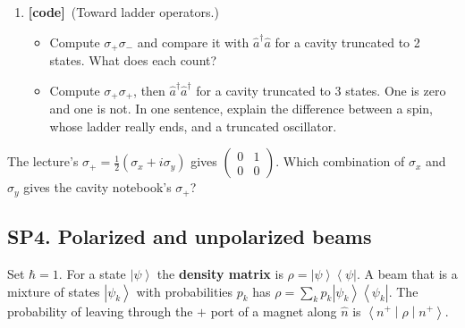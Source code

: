 \documentclass[11pt]{article}
\newif\ifsolutions
\newcommand{\tagbox}[2]{\textcolor{#1}{\textsf{\textbf{[#2]}}}}
\newcommand{\code}{\tagbox{codec}{code}}
\newcommand{\ans}[1]{\ifsolutions\par\noindent\hspace*{1.5em}\textcolor{ansc}{\small\textit{Answer:} #1}\fi}
\newcommand{\ket}[1]{\left|#1\right\rangle}
\newcommand{\bra}[1]{\left\langle#1\right|}
\newcommand{\mel}[3]{\left\langle#1\middle|#2\middle|#3\right\rangle}
\newcommand{\ad}{\hat{a}^{\dagger}}
\newcommand{\aop}{\hat{a}}
\newcommand{\mat}[4]{\begin{pmatrix}#1 & #2\\ #3 & #4\end{pmatrix}}
\begin{document}
\begin{enumerate}
\item \code\ (Toward ladder operators.)
\begin{itemize}
\item Compute $\sigma_+\sigma_-$ and compare it with $\ad\aop$ for a cavity truncated to 2 states. What does each count?
\item Compute $\sigma_+\sigma_+$, then $\ad\ad$ for a cavity truncated to 3 states. One is zero and one is not.
In one sentence, explain the difference between a spin, whose ladder really ends, and a truncated oscillator.
\end{itemize}
\ans{Both equal $\mat0001$: each counts excitations (qubit excited / one photon). $\sigma_+^2 = 0$ exactly, because a spin-$\tfrac12$ has only two rungs; $(\ad)^2 \neq 0$ (entry $\sqrt2$ taking $\ket0\to\ket2$) because the oscillator ladder continues and the truncation only hides it.}
\end{enumerate}

\begin{gradext}
The lecture's $\sigma_+ = \tfrac12(\sigma_x + i\sigma_y)$ gives $\mat0100$.
Which combination of $\sigma_x$ and $\sigma_y$ gives the cavity notebook's $\sigma_+$?
\ans{$\tfrac12(\sigma_x - i\sigma_y)$.}
\end{gradext}

\subsection*{SP4. Polarized and unpolarized beams}

Set $\hbar = 1$. For a state $\ket\psi$ the \textbf{density matrix} is $\rho = \ket\psi\bra\psi$.
A beam that is a mixture of states $\ket{\psi_k}$ with probabilities $p_k$ has $\rho = \sum_k p_k \ket{\psi_k}\bra{\psi_k}$.
The probability of leaving through the $+$ port of a magnet along $\hat n$ is $\mel{n^+}{\rho}{n^+}$.
\end{document}
